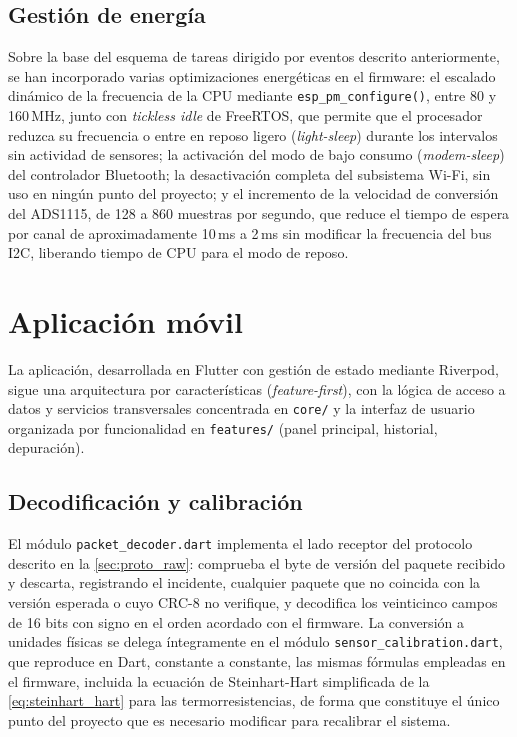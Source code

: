 \begin{IAtext}
\subsection{Gestión de energía}
Sobre la base del esquema de tareas dirigido por eventos descrito anteriormente, se han incorporado varias optimizaciones energéticas en el firmware: el escalado dinámico de la frecuencia de la CPU mediante \texttt{esp\_pm\_configure()}, entre 80 y 160\,MHz, junto con \textit{tickless idle} de FreeRTOS, que permite que el procesador reduzca su frecuencia o entre en reposo ligero (\textit{light-sleep}) durante los intervalos sin actividad de sensores; la activación del modo de bajo consumo (\textit{modem-sleep}) del controlador Bluetooth; la desactivación completa del subsistema Wi-Fi, sin uso en ningún punto del proyecto; y el incremento de la velocidad de conversión del ADS1115, de 128 a 860 muestras por segundo, que reduce el tiempo de espera por canal de aproximadamente 10\,ms a 2\,ms sin modificar la frecuencia del bus I2C, liberando tiempo de CPU para el modo de reposo.

\section{Aplicación móvil}

La aplicación, desarrollada en Flutter con gestión de estado mediante Riverpod, sigue una arquitectura por características (\textit{feature-first}), con la lógica de acceso a datos y servicios transversales concentrada en \texttt{core/} y la interfaz de usuario organizada por funcionalidad en \texttt{features/} (panel principal, historial, depuración).

\subsection{Decodificación y calibración}\label{sec:decodificacion_calibracion}
El módulo \texttt{packet\_decoder.dart} implementa el lado receptor del protocolo descrito en la \cref{sec:proto_raw}: comprueba el byte de versión del paquete recibido y descarta, registrando el incidente, cualquier paquete que no coincida con la versión esperada o cuyo CRC-8 no verifique, y decodifica los veinticinco campos de 16 bits con signo en el orden acordado con el firmware. La conversión a unidades físicas se delega íntegramente en el módulo \texttt{sensor\_calibration.dart}, que reproduce en Dart, constante a constante, las mismas fórmulas empleadas en el firmware, incluida la ecuación de Steinhart-Hart simplificada de la \cref{eq:steinhart_hart} para las termorresistencias, de forma que constituye el único punto del proyecto que es necesario modificar para recalibrar el sistema.


\end{IAtext}
